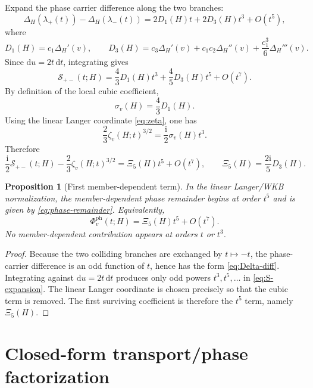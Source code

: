 \documentclass[11pt]{article}
\newtheorem{proposition}{Proposition}
\newcommand{\ii}{\mathrm i}
\newcommand{\dd}{\mathrm d}
\newcommand{\pairgap}{\Delta}
\begin{document}
Expand the phase carrier difference along the two branches:
\begin{equation}
\label{eq:Delta-diff}
 \pairgap_H(\lambda_+(t)) - \pairgap_H(\lambda_-(t)) = 2D_1(H)t + 2D_3(H)t^3 + O(t^5),
\end{equation}
where
\begin{equation}
\label{eq:D1D3}
 D_1(H)=c_1\pairgap_H'(v),
 \qquad
 D_3(H)=c_3\pairgap_H'(v)+c_1c_2\pairgap_H''(v)+\frac{c_1^3}{6}\pairgap_H'''(v).
\end{equation}
Since $\dd u=2t\,\dd t$, integrating gives
\begin{equation}
\label{eq:S-expansion}
 \mathcal S_{+-}(t;H)=\frac{4}{3}D_1(H)t^3+\frac{4}{5}D_3(H)t^5+O(t^7).
\end{equation}
By definition of the local cubic coefficient,
\[
 \sigma_v(H)=\frac{4}{3}D_1(H).
\]
Using the linear Langer coordinate \eqref{eq:zeta}, one has
\[
 \frac{2}{3}\zeta_v(H;t)^{3/2}=\frac{\ii}{2}\sigma_v(H)t^3.
\]
Therefore
\begin{equation}
\label{eq:phase-remainder}
 \frac{\ii}{2}\mathcal S_{+-}(t;H)-\frac{2}{3}\zeta_v(H;t)^{3/2}
 = \Xi_5(H)t^5+O(t^7),
 \qquad
 \boxed{\Xi_5(H)=\frac{2\ii}{5}D_3(H).}
\end{equation}

\begin{proposition}[First member-dependent term]
\label{prop:Xi5}
In the linear Langer/WKB normalization, the member-dependent phase remainder begins at order $t^5$ and is given by \eqref{eq:phase-remainder}.  Equivalently,
\[
\Phi_v^{\mathrm{ph}}(t;H)=\Xi_5(H)t^5+O(t^7).
\]
No member-dependent contribution appears at orders $t$ or $t^3$.
\end{proposition}

\begin{proof}
Because the two colliding branches are exchanged by $t\mapsto -t$, the phase-carrier difference is an odd function of $t$, hence has the form \eqref{eq:Delta-diff}.  Integrating against $\dd u=2t\,\dd t$ produces only odd powers $t^3,t^5,\dots$ in \eqref{eq:S-expansion}.  The linear Langer coordinate is chosen precisely so that the cubic term is removed.  The first surviving coefficient is therefore the $t^5$ term, namely $\Xi_5(H)$.
\end{proof}

\section{Closed-form transport/phase factorization}
\end{document}
